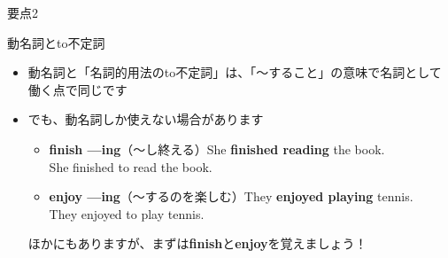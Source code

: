\documentclass[aspectratio=169,xcolor={dvipsnames,table}]{beamer}
\begin{document}
\begin{frame}[plain]{要点2}

\begin{block}{動名詞とto不定詞}
\begin{itemize}[square]\small
 \item  動名詞と「名詞的用法のto不定詞」は、「〜すること」の意味で名詞として働く点で同じです
 \item でも、動名詞しか使えない場合があります \dbend
       \begin{itemize}[circle]\small
	\item \textbf{finish ---ing}（〜し終える）\hfill{\scriptsize She \textbf{finished reading} the book.}\\
\hfill{{\scriptsize *She finished to read the book.}}
	\item \textbf{enjoy ---ing}（〜するのを楽しむ）\hfill{\scriptsize They \textbf{enjoyed playing} tennis.}\\
\hfill{{\scriptsize *They enjoyed to play tennis.}}
       \end{itemize}
\hfill{}ほかにもありますが、まずは\textbf{finish}と\textbf{enjoy}を覚えましょう！
 \end{itemize}
     \end{block}
\end{frame}
\end{document}

